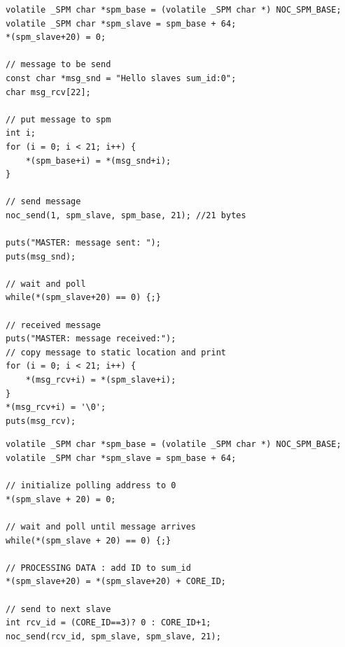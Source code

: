 \documentclass[a4paper,fontsize=10pt,twoside,DIV15,BCOR12mm,headinclude=true,footinclude=false,pagesize,bibtotoc]{scrbook}
\begin{document}

\begin{lstlisting}[float,caption={A 2x2 Hello World application: Master application.\label{lst:hello_master}}]
volatile _SPM char *spm_base = (volatile _SPM char *) NOC_SPM_BASE;
volatile _SPM char *spm_slave = spm_base + 64;
*(spm_slave+20) = 0;

// message to be send
const char *msg_snd = "Hello slaves sum_id:0";
char msg_rcv[22];

// put message to spm
int i;
for (i = 0; i < 21; i++) {
	*(spm_base+i) = *(msg_snd+i);
}

// send message
noc_send(1, spm_slave, spm_base, 21); //21 bytes

puts("MASTER: message sent: ");
puts(msg_snd);

// wait and poll
while(*(spm_slave+20) == 0) {;}

// received message
puts("MASTER: message received:");
// copy message to static location and print
for (i = 0; i < 21; i++) {
	*(msg_rcv+i) = *(spm_slave+i);
}
*(msg_rcv+i) = '\0';
puts(msg_rcv);

\end{lstlisting}




\begin{lstlisting}[float,caption={A 2x2 Hello World application: Slave application.\label{lst:hello_slave}}]
volatile _SPM char *spm_base = (volatile _SPM char *) NOC_SPM_BASE;
volatile _SPM char *spm_slave = spm_base + 64;

// initialize polling address to 0
*(spm_slave + 20) = 0;

// wait and poll until message arrives
while(*(spm_slave + 20) == 0) {;}

// PROCESSING DATA : add ID to sum_id
*(spm_slave+20) = *(spm_slave+20) + CORE_ID;

// send to next slave
int rcv_id = (CORE_ID==3)? 0 : CORE_ID+1;
noc_send(rcv_id, spm_slave, spm_slave, 21);

\end{lstlisting}
\end{document}
